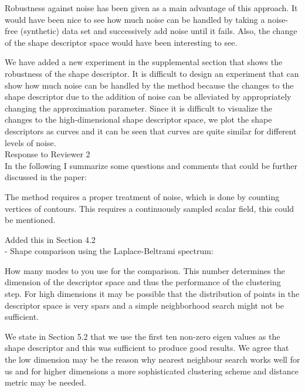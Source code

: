 \documentclass[10pt]{article}
\begin{document}
   Robustness against noise has been given as a main advantage of this
   approach. It would have been nice to see how much noise can be handled by
   taking a noise-free (synthetic) data set and successively add noise until
   it fails. Also, the change of the shape descriptor space would have been
   interesting to see.

   {\color{blue}We have added a new experiment in the supplemental section
	   that shows the robustness of the shape descriptor. It is difficult
	   to design an experiment that can show how much noise can be handled by the
	   method because the changes to the shape descriptor due to the addition of
	   noise can be alleviated by appropriately changing the approximation parameter.
	   Since it is difficult to visualize the changes
	   to the high-dimensional shape descriptor space, we plot the shape descriptors
   as curves and it can be seen that curves are quite similar for different levels of noise.}\\



{\noindent \LARGE Response to Reviewer 2}\\

	In the following I summarize some questions and comments that could be
   further discussed in the paper:

   The method requires a proper treatment of noise, which is done by
   counting vertices of contours. This requires a continuously sampled
   scalar field, this could be mentioned.

   {\color{blue}Added this in Section 4.2}\\

   - Shape comparison using the Laplace-Beltrami spectrum:

   How many modes to you use for the comparison. This number determines
   the dimension of the descriptor space and thus the performance of the
   clustering step. For high dimensions it may be possible that the
   distribution of points in the descriptor space is very spars and a simple
   neighborhood search might not be sufficient. 

   {\color{blue}We state in Section 5.2 that we use the first ten non-zero eigen
	   values as the shape descriptor and this was sufficient to produce
	   good results. 
	   We agree that the low dimension
	   may be the reason why
	   nearest neighbour search works well for us 
	   and for higher dimensions a more sophisticated clustering
   scheme and distance metric may be needed.}\\
\end{document}
